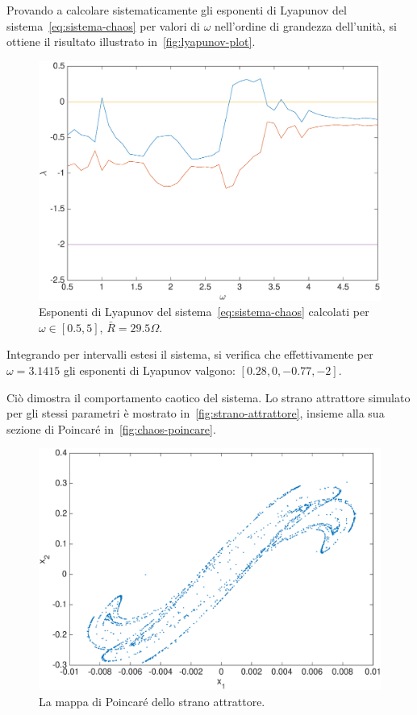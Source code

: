 Provando a calcolare sistematicamente gli esponenti di Lyapunov del sistema~\ref{eq:sistema-chaos} per valori di $\omega$ nell'ordine di grandezza dell'unità, si ottiene il risultato illustrato in~\autoref{fig:lyapunov-plot}.

\begin{figure}
    \centering
    \includegraphics[width=\textwidth]{matcont/LyapunovPlot}
    \caption{Esponenti di Lyapunov del sistema~\ref{eq:sistema-chaos} calcolati per $\omega \in [0.5, 5]$, $\bar{R}=29.5 \Omega$.}
    \label{fig:lyapunov-plot}
\end{figure}

Integrando per intervalli estesi il sistema, si verifica che effettivamente per $\omega = 3.1415$ gli esponenti di Lyapunov valgono: $[0.28, 0, -0.77, -2]$.

Ciò dimostra il comportamento caotico del sistema. Lo strano attrattore simulato per gli stessi parametri è mostrato in~\autoref{fig:strano-attrattore}, insieme alla sua sezione di Poincaré in~\autoref{fig:chaos-poincare}.

\begin{figure}
    \centering
    \includegraphics[width=\textwidth]{matcont/PoincareCaos}
    \caption{La mappa di Poincaré dello strano attrattore.}
    \label{fig:chaos-poincare}
\end{figure}

